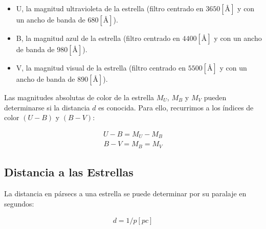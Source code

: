 \documentclass{tufte-handout}
\begin{document}
\begin{itemize}
  \item U, la magnitud ultravioleta de la estrella (filtro centrado en $3650 [\si{\angstrom}]$ y con un ancho de banda de $680 [\si{\angstrom}]$).
  \item B, la magnitud azul de la estrella (filtro centrado en $4400 [\si{\angstrom}]$ y con un ancho de banda de $980 [\si{\angstrom}]$).
  \item V, la magnitud visual de la estrella (filtro centrado en $5500 [\si{\angstrom}]$ y con un ancho de banda de $890 [\si{\angstrom}]$).
\end{itemize}

Las magnitudes absolutas de color de la estrella $M_U$, $M_B$ y $M_V$ pueden determinarse si la distancia $d$ es conocida. Para ello, recurrimos a los índices de color $(U-B)$ y $(B-V)$:

\begin{align}
  U - B = M_U - M_B
\end{align}
\begin{align}
  B - V = M_B = M_V
\end{align}


\subsection{Distancia a las Estrellas}

La distancia en pársecs a una estrella se puede determinar por su paralaje en segundos:

\begin{align}
  d = 1 / p [pc]
\end{align}

\clearpage
\end{document}
